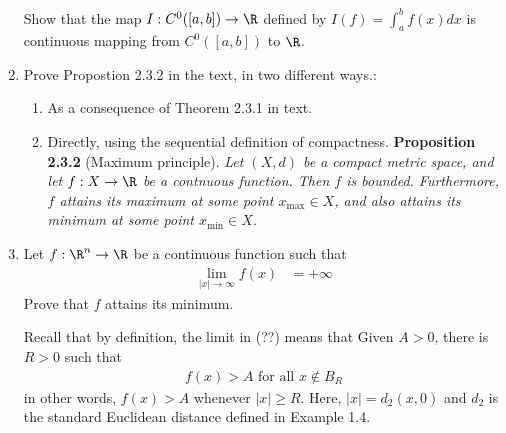 \documentclass[10pt,a4paper]{report}
\begin{document}
\begin{enumerate}[label=\Roman*.]
	Show that the map $I: C^0([a,b]) \to \R$ defined by $I(f)=\int_a^b f(x) dx$ is continuous mapping from $C^0([a,b])$ to $\R$.
	
	\item Prove Propostion 2.3.2 in the text, in two different ways.:
	\begin{enumerate}[label=\alph*)]
		\item As a consequence of Theorem 2.3.1 in text.
		\item Directly, using the sequential definition of compactness.
		\textbf{Proposition 2.3.2} (Maximum principle). \textit{ Let $(X,d)$ be a compact metric space, and let $f:X \to \R$ be a contnuous function.  Then $f$ is bounded.  Furthermore, $f$ attains its maximum at some point $x_{\max} \in X$, and also attains its minimum at some point $x_{\min} \in X$. }
	\end{enumerate}
	
	\item Let $f:\R^n \to \R$ be a continuous function such that 
	\begin{align*}
		\lim_{|x| \to \infty} f(x) &= + \infty
	\end{align*}Prove that $f$ attains its minimum.
	
	Recall that by definition, the limit in (??) means that Given $A > 0$, there is $R>0$ such that 
	\begin{align*}
		f(x) >A \text{    for all } x \not\in B_R
	\end{align*}in other words, $f(x) >A$ whenever $|x| \ge R$. Here, $|x| = d_2(x,0)$ and $d_2$ is the standard Euclidean distance defined in Example 1.4.
\end{enumerate}
\end{document}
